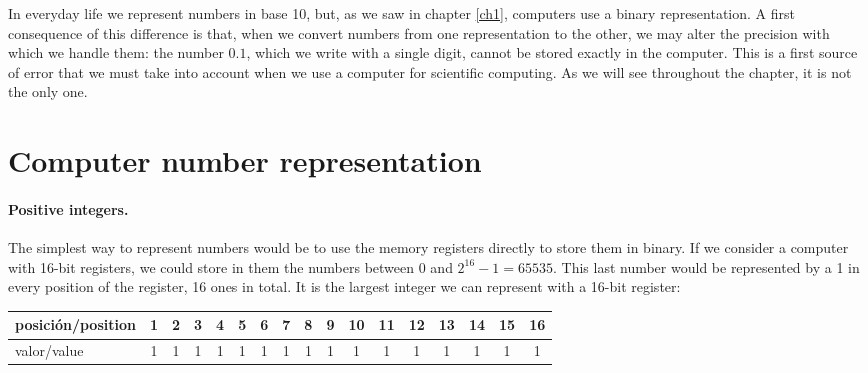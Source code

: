 \begin{paracol}{2}
In everyday life we represent numbers in base 10, but, as we saw in chapter \ref{ch1}, computers use a binary representation. A first consequence of this difference is that, when we convert numbers from one representation to the other, we may alter the precision with which we handle them: the number $0.1$, which we write with a single digit, cannot be stored exactly in the computer. This is a first source of error that we must take into account when we use a computer for scientific computing. As we will see throughout the chapter, it is not the only one.

\section{Computer number representation}
\paragraph{Positive integers.} The simplest way to represent numbers would be to use the memory registers directly to store them in binary. If we consider a computer with 16-bit registers, we could store in them the numbers between $0$ and $2^{16}-1=65535$. This last number would be represented by a 1 in every position of the register, 16 ones in total. It is the largest integer we can represent with a 16-bit register:
\end{paracol}

\begin{center}
\begin{tabular}{|l|c|c|c|c|c|c|c|c|c|c|c|c|c|c|c|c|}
\hline
posición/position&1&2&3&4&5&6&7&8&9&10&11&12&13&14&15&16  \\
\hline
valor/value&1&1&1&1&1&1&1&1&1&1&1&1&1&1&1&1 \\
\hline
\end{tabular}
\end{center}


